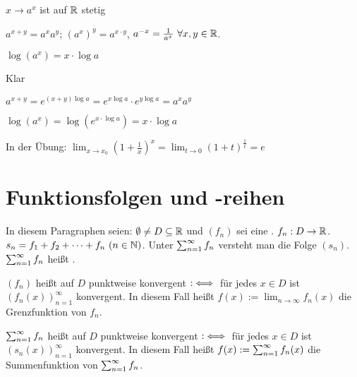 \documentclass[a4paper,oneside,DIV15,BCOR12mm]{scrbook}
\begin{document}
\begin{eigenschaften}
\begin{liste}
\item $x \to a^x$ ist auf $\mathbb{R}$ stetig
\item $a^{x+y} = a^xa^y$; $(a^x)^y = a^{x\cdot y}$, $a^{-x} = \frac{1}{a^x}\ \forall x,y \in\mathbb{R}$.
\item $\log (a^x) = x\cdot \log a$
\end{liste}

\begin{beweise}
\item Klar
\item $a^{x+y} = e^{(x+y) \log a} = e^{x\log a} \cdot e^{y\log a} = a^xa^y$
\item $\log (a^x) = \log (e^{x\cdot \log a}) = x \cdot \log a$
\end{beweise}

In der Übung: $\displaystyle\lim_{x \to x_0} (1+\frac{1}{x})^x = \lim_{t \to 0} (1+t)^\frac{1}{t} = e$
\end{eigenschaften}

\chapter{Funktionsfolgen und -reihen}

In diesem Paragraphen seien: $\emptyset \ne D \subseteq \mathbb{R}$ und $(f_n)$ sei eine . $f_n:D\to\mathbb{R}$. $s_n = f_1 + f_2 + \cdots + f_n\ (n\in\mathbb{N})$. Unter $\sum_{n=1}^{\infty}{f_n}$ versteht man die Folge $(s_n)$. $\sum_{n=1}^{\infty}{f_n}$ heißt .

\begin{definition}
$(f_n)$ heißt auf $D$ punktweise konvergent $:\iff$ für jedes $x\in D$ ist $(f_n(x))_{n=1}^\infty$ konvergent. In diesem Fall heißt $f(x) := \displaystyle\lim_{n\to\infty} f_n(x)$ die Grenzfunktion von $f_n$.

$\sum_{n=1}^{\infty}{f_n}$ heißt auf $D$ punktweise konvergent $:\iff$ für jedes $x\in D$ ist $(s_n(x))_{n=1}^\infty$ konvergent. In diesem Fall heißt $f(x) := \sum_{n=1}^{\infty}{f_n(x)}$ die Summenfunktion von $\sum_{n=1}^{\infty}{f_n}$.
\end{definition}
\end{document}
